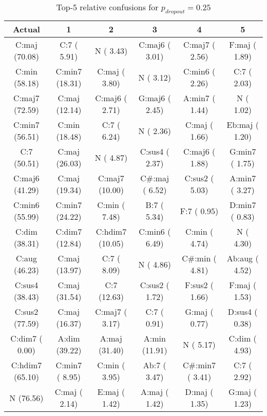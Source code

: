 \begin{table}[h]
\begin{center}
\begin{scriptsize}
\caption{Top-5 relative confusions for $p_{dropout} = 0.25$}
\label{tab:baseline_confs}
\begin{tabular}{c || c | c | c | c | c |}
\hline
Actual & 1 & 2 & 3 & 4 & 5 \\
\hline
C:maj (70.08) &     C:7 ( 5.91) &       N ( 3.43) &  C:maj6 ( 3.01) &  C:maj7 ( 2.56) &   F:maj ( 1.89) \\
  C:min (58.18) &  C:min7 (18.31) &   C:maj ( 3.80) &       N ( 3.12) &  C:min6 ( 2.26) &     C:7 ( 2.03) \\
 C:maj7 (72.59) &   C:maj (12.14) &  C:maj6 ( 2.71) &  G:maj6 ( 2.45) &  A:min7 ( 1.44) &       N ( 1.02) \\
 C:min7 (56.51) &   C:min (18.48) &     C:7 ( 6.24) &       N ( 2.36) &   C:maj ( 1.66) &  Eb:maj ( 1.20) \\
C:7 (50.51) &   C:maj (26.03) &       N ( 4.87) &  C:sus4 ( 2.37) &  C:maj6 ( 1.88) &  G:min7 ( 1.75) \\
\hline
 C:maj6 (41.29) &   C:maj (19.34) &  C:maj7 (10.00) &  C\#:maj ( 6.52) &  C:sus2 ( 5.03) &  A:min7 ( 3.27) \\
 C:min6 (55.99) &  C:min7 (24.22) &   C:min ( 7.48) &     B:7 ( 5.34) &     F:7 ( 0.95) &  D:min7 ( 0.83) \\
  C:dim (38.31) &  C:dim7 (12.84) & C:hdim7 (10.05) &  C:min6 ( 6.49) &   C:min ( 4.74) &       N ( 4.30) \\
  C:aug (46.23) &   C:maj (13.97) &     C:7 ( 8.09) &       N ( 4.86) &  C\#:min ( 4.81) &  Ab:aug ( 4.52) \\
 C:sus4 (38.43) &   C:maj (31.54) &     C:7 (12.63) &  C:sus2 ( 1.72) &  F:sus2 ( 1.66) &   F:maj ( 1.53) \\
 C:sus2 (77.59) &   C:maj (16.37) &  C:maj7 ( 3.17) &     C:7 ( 0.91) &   G:maj ( 0.77) &  D:sus4 ( 0.38) \\
 C:dim7 ( 0.00) &   A:dim (39.22) &   A:maj (31.40) &   A:min (11.91) &       N ( 5.17) &   C:dim ( 4.93) \\
C:hdim7 (65.10) &  C:min7 ( 8.95) &   C:min ( 3.95) &    Ab:7 ( 3.47) & C\#:min7 ( 3.41) &     C:7 ( 2.92) \\
\hline
      N (76.56) &   C:maj ( 2.14) &   E:maj ( 1.42) &   A:maj ( 1.42) &   D:maj ( 1.35) &   G:maj ( 1.23) \\
\hline
\end{tabular}
\end{scriptsize}
\end{center}
\end{table}

